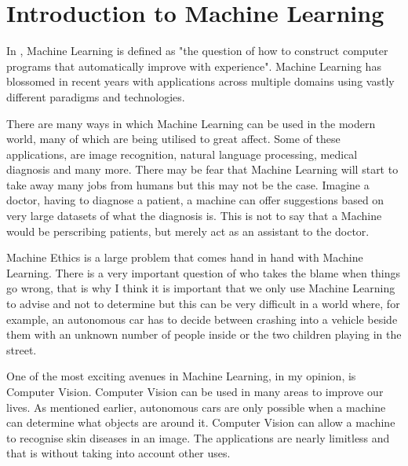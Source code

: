 \section{Introduction to Machine Learning}
In \textcite{MLANN}, Machine Learning is defined as "the question of how to
construct computer programs that automatically improve with experience".
Machine Learning has blossomed in recent years with applications across multiple
domains using vastly different paradigms and technologies.

There are many ways in which Machine Learning can be used in the modern world,
many of which are being utilised to great affect.
Some of these applications, are image recognition, natural language
processing,
medical diagnosis and many more.
There may be fear that Machine Learning will start to take away many jobs
from
humans but this may not be the case. Imagine a doctor, having to diagnose a
patient, a machine can offer suggestions based on very large datasets of
what
the diagnosis is. This is not to say that a Machine would be
perscribing patients, but merely act as an assistant to the doctor.

Machine Ethics is a large problem that comes hand in hand with Machine
Learning.
There is a very important question of who takes the blame when things go
wrong,
that is why I think it is important that we only use Machine Learning to
advise
and not to determine but this can be very difficult in a world where, for
example, an autonomous car has to decide between crashing into a vehicle
beside
them with an unknown number of people inside or the two children playing in
the street.

One of the most exciting avenues in Machine Learning, in my opinion, is
Computer
Vision. Computer Vision can be used in many areas to improve our lives. As
mentioned earlier, autonomous cars are only possible when a machine can
determine what objects are around it. Computer Vision can allow a machine to
recognise skin diseases in an image. The applications are nearly limitless
and
that is without taking into account other uses.

